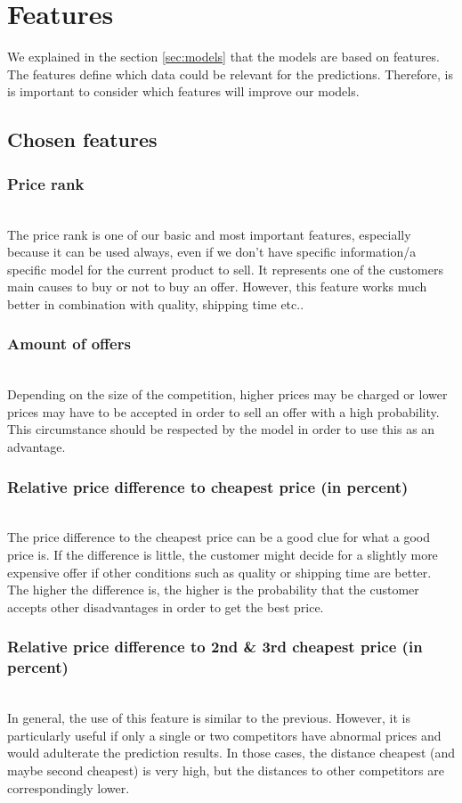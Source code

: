\section{Features}
\label{sec:features}

	We explained in the section \ref{sec:models} that the models are based on features. The features define which data could be relevant for the predictions. Therefore, is is important to consider which features will improve our models.
\subsection{Chosen features}
	\subsubsection{Price rank}
	\label{sec:pricerank}
		~\\
		The price rank is one of our basic and most important features, especially because it can be used always, even if we don't have specific information/a specific model for the current product to sell. It represents one of the customers main causes to buy or not to buy an offer. However, this feature works much better in combination with quality, shipping time etc..
	\subsubsection{Amount of offers}
		~\\
		Depending on the size of the competition, higher prices may be charged or lower prices may have to be accepted in order to sell an offer with a high probability. This circumstance should be respected by the model in order to use this as an advantage.
	\subsubsection{Relative price difference to cheapest price (in percent)}
		~\\
		The price difference to the cheapest price can be a good clue for what a good price is. If the difference is little, the customer might decide for a slightly more expensive offer if other conditions such as quality or shipping time are better. The higher the difference is, the higher is the probability that the customer accepts other disadvantages in order to get the best price.
	\subsubsection{Relative price difference to 2nd \& 3rd cheapest price (in percent)}
	\label{sec:pricediff3}
		~\\
		In general, the use of this feature is similar to the previous. However, it is particularly useful if only a single or two competitors have abnormal prices and would adulterate the prediction results. In those cases, the distance cheapest (and maybe second cheapest) is very high, but the distances to other competitors are correspondingly lower.
